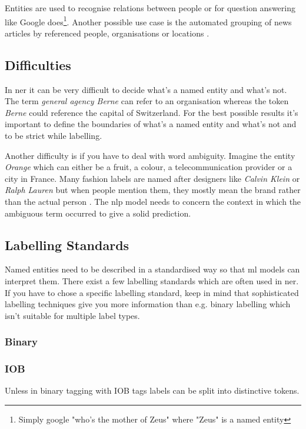 Entities are used to recognise relations between people or for question answering like Google does\footnote{Simply google "who's
the mother of Zeus" where "Zeus" is a named entity}. Another possible use case is the automated grouping of news articles by
referenced people, organisations or locations \cite{gupta}.

\subsection{Difficulties}

In \acrlong{ner} it can be very difficult to decide what's a named entity and what's not. The term \emph{general agency Berne} can
refer to an organisation whereas the token \emph{Berne} could reference the capital of Switzerland. For the best possible results
it's important to define the boundaries of what's a named entity and what's not and to be strict while labelling.

Another difficulty is if you have to deal with word ambiguity. Imagine the entity \emph{Orange} which can either be a fruit, a colour,
a telecommunication provider or a city in France. Many fashion labels are named after designers like \emph{Calvin Klein} or \emph{Ralph
Lauren} but when people mention them, they mostly mean the brand rather than the actual person \cite{Vogel19}. The \acrshort{nlp} model
needs to concern the context in which the ambiguous term occurred to give a solid prediction.

\subsection{Labelling Standards}

Named entities need to be described in a standardised way so that \acrshort{ml} models can interpret them. There exist a few labelling
standards which are often used in \acrshort{ner}. If you have to chose a specific labelling standard, keep in mind that sophisticated
labelling techniques give you more information than e.g. binary labelling which isn't suitable for multiple label types.

\subsubsection{Binary}



\subsubsection{IOB}

Unless in binary tagging with IOB tags labels can be split into distinctive tokens.

\cite{bio95}